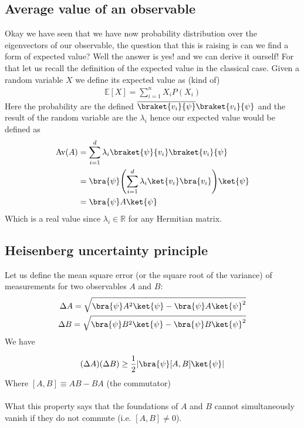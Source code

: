 \subsection{Average value of an observable}
Okay we have seen that we have now probability distribution over the eigenvectors of our observable, the question that this is raising is can we find a form of expected value? Well the answer is yes! and we can derive it ourself! For that let us recall the definition of the expected value in the classical case. Given a random variable $X$ we define its expected value as (kind of)
\begin{align*} 
	\mathbb{E}\left[X\right] = \sum_{i= 1}^{n} X_i P(X_i) 
\end{align*}
Here the probability are the defined $\overline{\braket{v_i}{\psi}}\braket{v_i}{\psi}$ and the result of the random variable are the $\lambda_i$ hence our expected value would be defined as 
\begin{align*} 
	\text{Av}\left(A\right) &= \sum_{i= 1}^{d}  \lambda_i \braket{\psi}{v_i} \braket{v_i}{\psi}\\
							&= \bra{\psi}\left(\sum_{i= 1}^{d} \lambda_i\ket{v_i}\bra{v_i}\right)\ket{\psi}\\
							&= \bra{\psi} A \ket{\psi}
\end{align*}
Which is a real value since $\lambda_i \in \mathbb{R}$ for any Hermitian matrix.

\subsection{Heisenberg uncertainty principle}
Let us define the mean square error (or the square root of the variance) of measurements for two observables $A$ and $B$:
\begin{align*} 
	\Delta A = \sqrt{\bra{\psi}A^2 \ket{\psi} - \bra{\psi}A\ket{\psi}^2} \\
	\Delta B = \sqrt{\bra{\psi}B^2 \ket{\psi} - \bra{\psi}B\ket{\psi}^2}
\end{align*}
We have

\begin{align*} 
	\left(\Delta A\right)\left(\Delta B\right) \geq \frac{1}{2}\left| \bra{\psi}\left[A, B\right]\ket{\psi}\right| 
\end{align*}
Where $\left[A, B\right] \equiv AB - BA$ (the commutator)\\
$ $\\
What this property says that the foundations of $A$ and $B$ cannot simultaneously vanish if they do not commute (i.e. $\left[A, B\right] \neq 0$).


